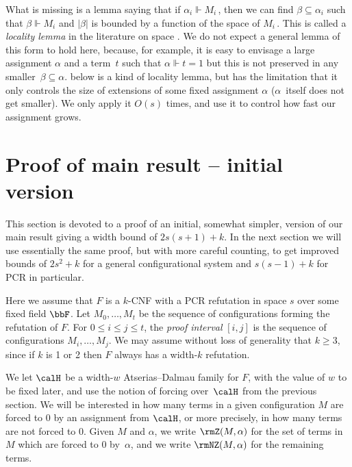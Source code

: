 What is missing is a lemma saying that 
if $\alpha_i \Vdash M_i$\,, then we can find $\beta \subseteq \alpha_i$
such that $\beta \Vdash M_i$ and $|\beta|$ is bounded by a  
function of the space of $M_i$\,.
This is called a \emph{locality lemma} in the literature on space
\cite{ABRW,DBLP:journals/rsa/Ben-SassonG03,DBLP:journals/jacm/BonacinaG15}.
We do not expect a general lemma of this form to hold here,
because, for example, it is easy to envisage a large assignment
$\alpha$ and a term~$t$ such that $\alpha \Vdash t=1$
but this is not preserved in any smaller~$\beta \subseteq \alpha$.
 below is a kind of locality lemma, but has
the limitation that it only controls the size of extensions of some fixed
assignment $\alpha$ ($\alpha$~itself does not get smaller). 
We only apply it $O(s)$ times, and use it to control how fast our assignment grows.

%
\section{Proof of main result -- initial version} \label{sec:main}\label{sec:upanddown}
%

This section is devoted to a proof of an initial, somewhat simpler, version of our main result
giving a width bound of $2s(s+1)+k$.
In the next section we will use essentially the same proof,
but with more careful counting, to get improved bounds
of $2s^2+k$ for a general configurational system
and $s(s-1)+k$ for PCR in particular.


Here we assume that $F$ is a $k$-CNF 
with a PCR refutation in space $s$ over
some fixed field $\bbF$. 
Let $M_0, \ldots, M_t$ be the sequence of configurations
forming the refutation of $F$. For $0 \le i \le j \le t$,
the \emph{proof interval} $[i,j]$ is the sequence of configurations $M_i, \ldots, M_j$.
We may assume without loss of generality that $k \ge 3$, since if $k$ is 1 or 2
then $F$ always has a width-$k$ refutation. 

We let $\calH$ be a width-$w$ Atserias--Dalmau family for $F$,
with the value of $w$ to be fixed later,
 and  use the notion of forcing over~$\calH$ from
the previous section.
We will be interested in how many terms in a given configuration
$M$ are forced to $0$ by an assignment from $\calH$, 
or more precisely, in how many terms are not forced to $0$. 
Given $M$ and $\alpha$, 
we write $\rmZ(M, \alpha)$ for the set of terms in $M$ which 
are forced to $0$ by~$\alpha$, and we write $\rmNZ(M, \alpha)$
for the remaining terms.


